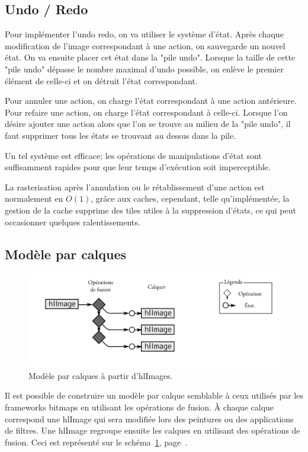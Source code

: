 		\subsection{Undo / Redo}
			Pour implémenter l'undo redo, on va utiliser le système d'état. Après chaque modification de l'image correspondant à une action,
			on sauvegarde un nouvel état. On va ensuite placer cet état dans la "pile undo". 
			Lorsque la taille de cette "pile undo" dépasse le nombre maximal d'undo possible, on enlève le premier élément de celle-ci 
			et on détruit l'état correspondant. 

			Pour annuler une action, on charge l'état correspondant à une action antérieure. Pour refaire une action,
			on charge l'état correspondant à celle-ci. Lorsque l'on désire ajouter une action alors que l'on se trouve au milieu de la "pile undo",
			il faut supprimer tous les états se trouvant au dessus dans la pile. 

			Un tel système est efficace; les opérations de manipulations d'état sont suffisamment rapides pour que leur temps d'exécution
			soit imperceptible.
			
			La rasterisation après l'annulation ou le rétablissement d'une action est normalement en $O(1)$, grâce aux caches, 
			cependant, telle qu'implémentée, la gestion de la cache supprime des tiles utiles à la suppression d'états, ce qui peut occasionner
			quelques ralentissements. 
		\subsection{Modèle par calques}
		\begin{figure}[ht]
			\centering
			\includegraphics[width=\textwidth]{images/hl-calques} 
			\caption{Modèle par calques à partir d'hlImages.}
			\label{fig:hl-calques}
		\end{figure}
			Il est possible de construire un modèle par calque semblable à ceux utilisés par les frameworks bitmaps en utilisant les opérations
			de fusion. À chaque calque correspond une hlImage qui sera modifiée lors des peintures ou des applications de filtres. 
			Une hlImage regroupe ensuite les calques en utilisant des opérations de fusion. Ceci est représenté 
			sur le schéma~\ref{fig:hl-calques}, page~\pageref{fig:hl-calques}. 

